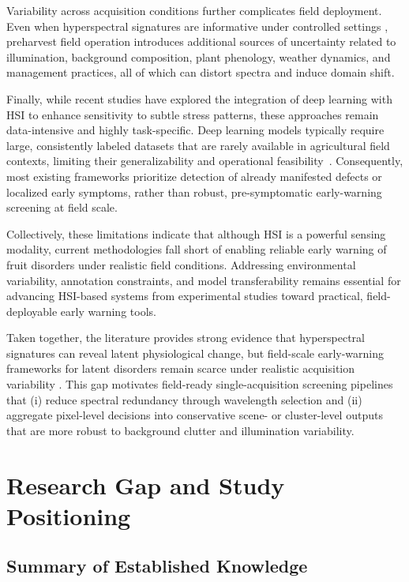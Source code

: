 \medskip
\noindent
Variability across acquisition conditions further complicates field deployment. Even when hyperspectral
signatures are informative under controlled settings \cite{min2023decay}, preharvest field operation introduces
additional sources of uncertainty related to illumination, background composition, plant phenology, weather
dynamics, and management practices, all of which can distort spectra and induce domain shift.

\medskip
\noindent
Finally, while recent studies have explored the integration of deep learning with HSI to
enhance sensitivity to subtle stress patterns, these approaches remain data-intensive and
highly task-specific. Deep learning models typically require large, consistently labeled
datasets that are rarely available in agricultural field contexts, limiting their
generalizability and operational feasibility~\cite{ou2024hyperspectral}. Consequently,
most existing frameworks prioritize detection of already manifested defects or localized
early symptoms, rather than robust, pre-symptomatic early-warning screening at field scale.

\medskip
\noindent
Collectively, these limitations indicate that although HSI is a powerful sensing modality,
current methodologies fall short of enabling reliable early warning of fruit disorders
under realistic field conditions. Addressing environmental variability, annotation
constraints, and model transferability remains essential for advancing HSI-based systems
from experimental studies toward practical, field-deployable early warning tools.

\medskip
\noindent
Taken together, the literature provides strong evidence that hyperspectral signatures can reveal latent physiological change, but field-scale early-warning frameworks for latent disorders remain scarce under realistic acquisition variability \cite{app13179740, agriculture15202167, RAM2024109037, su16146064}. This gap motivates field-ready single-acquisition screening pipelines that (i) reduce spectral redundancy through wavelength selection and (ii) aggregate pixel-level decisions into conservative scene- or cluster-level outputs that are more robust to background clutter and illumination variability.

\section{Research Gap and Study Positioning}
\label{sec:research_gap}

\subsection{Summary of Established Knowledge}
\label{subsec:gap_summary}

